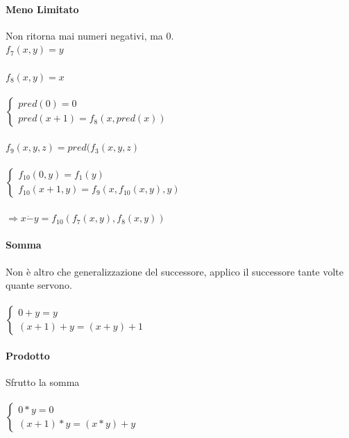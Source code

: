 \documentclass[10pt]{book}
\begin{document}
\begin{multicols}{2}
\paragraph{Meno Limitato} Non ritorna mai numeri negativi, ma 0.\\
$f_7(x, y) = y$\\\\
$f_8(x, y) = x$\\\\
\begin{math}
		\left\{
		\begin{array}{l}
			pred(0) = 0\\
			pred(x + 1) = f_8(x, pred(x))
		\end{array}
		\right.
\end{math}\\\\
$f_9(x, y, z) = pred(f_3(x, y, z)$\\\\
\begin{math}
		\left\{
		\begin{array}{l}
			f_{10}(0, y) = f_1(y)\\
			f_{10}(x + 1, y) = f_9(x, f_{10}(x, y), y)
		\end{array}
		\right.
\end{math}\\\\
$\Rightarrow x \dot{-} y = f_{10}(f_7(x, y), f_8(x, y))$
\columnbreak
\paragraph{Somma}
Non è altro che generalizzazione del successore, applico il successore tante volte quante servono.\\\\
\begin{math}
		\left\{
		\begin{array}{l}
			0 + y = y\\
			(x + 1) + y = (x + y) + 1
		\end{array}
		\right.
\end{math}
\paragraph{Prodotto}
Sfrutto la somma\\\\
\begin{math}
		\left\{
		\begin{array}{l}
			0 * y = 0\\
			(x + 1) * y = (x * y) + y
		\end{array}
		\right.
\end{math}

\end{multicols}
\end{document}
